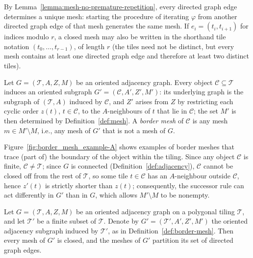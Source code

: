 \begin{remark}
    By Lemma~\ref{lemma:mesh-no-premature-repetition}, every directed graph edge determines a unique mesh: starting the procedure of iterating $\varphi$ from another directed graph edge of that mesh generates the same mesh.
    If $e_i=(t_i,t_{i+1})$ for indices modulo $r$, a closed mesh may also be written in the shorthand tile notation $(t_0,\dots,t_{r-1})$, of length $r$ (the tiles need not be distinct, but every mesh contains at least one directed graph edge and therefore at least two distinct tiles).
\end{remark}

\begin{definition}\label{def:border-mesh}
    Let $G=(\mathcal{T}, A, Z, M)$ be an oriented adjacency graph.
    Every object $\mathcal{C}\subseteq\mathcal{T}$ induces an oriented subgraph $G'=(\mathcal{C},A',Z',M')$: its underlying graph is the subgraph of $(\mathcal{T},A)$ induced by $\mathcal{C}$, and $Z'$ arises from $Z$ by restricting each cyclic order $z(t)$, $t\in\mathcal{C}$, to the $A$-neighbours of $t$ that lie in $\mathcal{C}$; the set $M'$ is then determined by Definition~\ref{def:mesh}.
    A \emph{border mesh} of $\mathcal{C}$ is any mesh $m\in M'\setminus M$, i.e., any mesh of $G'$ that is not a mesh of $G$.
\end{definition}

\begin{remark}
    Figure~\ref{fig:border_mesh_example-A} shows examples of border meshes that trace (part of) the boundary of the object within the tiling.
    Since any object $\mathcal{C}$ is finite, $\mathcal{C}\neq\mathcal{T}$; since $G$ is connected (Definition~\ref{def:adjacency}), $\mathcal{C}$ cannot be closed off from the rest of $\mathcal{T}$, so some tile $t\in\mathcal{C}$ has an $A$-neighbour outside $\mathcal{C}$, hence $z'(t)$ is strictly shorter than $z(t)$; consequently, the successor rule can act differently in $G'$ than in $G$, which allows $M'\setminus M$ to be nonempty.
\end{remark}

\begin{lemma}\label{lemma:finite-mesh-closed}
    Let $G=(\mathcal{T},A,Z,M)$ be an oriented adjacency graph on a polygonal tiling $\mathcal{T}$, and let $\mathcal{T}'$ be a finite subset of $\mathcal{T}$.
    Denote by $G'=(\mathcal{T}',A',Z',M')$ the oriented adjacency subgraph induced by $\mathcal{T}'$, as in Definition~\ref{def:border-mesh}.
    Then every mesh of $G'$ is closed, and the meshes of $G'$ partition its set of directed graph edges.
\end{lemma}


